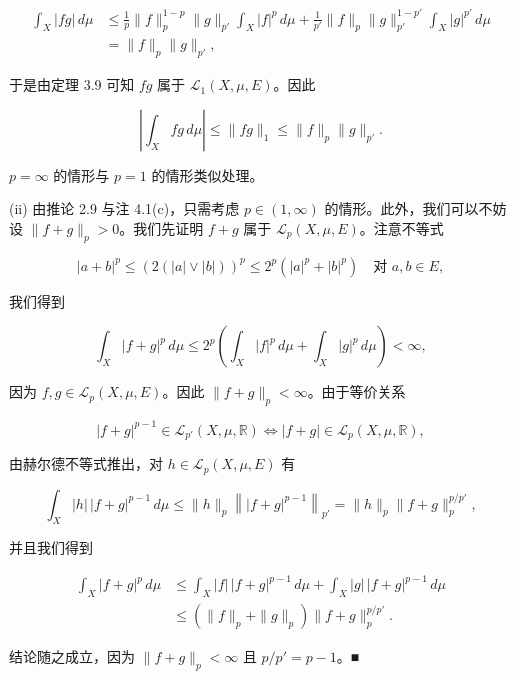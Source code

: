 \begin{theorem}
\begin{subitems}
\begin{equation*}
\begin{aligned}
\int_X |fg|\,d\mu &\le \frac{1}{p}\|f\|_p^{1-p}\|g\|_{p'}\int_X |f|^p\,d\mu + \frac{1}{p'}\|f\|_p\|g\|_{p'}^{1-p'}\int_X |g|^{p'}\,d\mu \\ &= \|f\|_p\|g\|_{p'} ,
\end{aligned}
\end{equation*}

于是由定理 3.9 可知 $ fg $ 属于 $ \mathcal{L}_1(X,\mu,E) $。因此

\[
\left|\int_X fg\,d\mu\right| \le \|fg\|_1 \le \|f\|_p\|g\|_{p'} .
\]

$ p = \infty $ 的情形与 $ p = 1 $ 的情形类似处理。

\end{subitems}

(ii) 由推论 2.9 与注 4.1(c)，只需考虑 $ p \in (1,\infty) $ 的情形。此外，我们可以不妨设 $ \|f + g\|_p > 0 $。我们先证明 $ f + g $ 属于 $ \mathcal{L}_p(X,\mu,E) $。注意不等式

\begin{equation}
|a + b|^p \le (2(|a| \vee |b|))^p \le 2^p(|a|^p + |b|^p) \quad \text{对 } a, b \in E,\tag{4.2}
\end{equation}

我们得到

\[
\int_X |f + g|^p\,d\mu \le 2^p\left(\int_X |f|^p\,d\mu + \int_X |g|^p\,d\mu\right) < \infty ,
\]

因为 $ f, g \in \mathcal{L}_p(X,\mu,E) $。因此 $ \|f + g\|_p < \infty $。由于等价关系

\[
|f + g|^{p-1} \in \mathcal{L}_{p'}(X,\mu,\mathbb{R}) \iff |f + g| \in \mathcal{L}_p(X,\mu,\mathbb{R}) ,
\]

由赫尔德不等式推出，对 $ h \in \mathcal{L}_p(X,\mu,E) $ 有

\[
\int_X |h|\,|f + g|^{p-1}\,d\mu \le \|h\|_p\left\||f + g|^{p-1}\right\|_{p'} = \|h\|_p\|f + g\|_p^{p/p'} ,
\]

并且我们得到

\begin{equation}
\begin{aligned}
\int_X |f + g|^p\,d\mu &\le \int_X |f|\,|f + g|^{p-1}\,d\mu + \int_X |g|\,|f + g|^{p-1}\,d\mu \\ &\le (\|f\|_p + \|g\|_p)\|f + g\|_p^{p/p'} .
\end{aligned}\tag{4.3}
\end{equation}

结论随之成立，因为 $ \|f + g\|_p < \infty $ 且 $ p/p' = p - 1 $。\nobreak\hspace{0.35em}■

\end{theorem}

